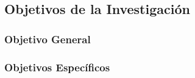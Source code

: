 \subsection{Objetivos de la Investigación}

\lipsum[7]

\subsubsection{Objetivo General}

\lipsum[8]

\subsubsection{Objetivos Específicos}

\lipsum[10]


